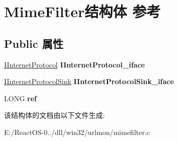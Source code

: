 \hypertarget{struct_mime_filter}{}\section{Mime\+Filter结构体 参考}
\label{struct_mime_filter}
\subsection*{Public 属性}
\begin{DoxyCompactItemize}
\item 
\mbox{\label{struct_mime_filter_a1b7a562b6f889b49c5cbcf7b13ff996d}} 
\hyperlink{interface_i_internet_protocol}{I\+Internet\+Protocol} {\bfseries I\+Internet\+Protocol\+\_\+iface}
\item 
\mbox{\label{struct_mime_filter_a3b451bb0dfb4edc800f9838ce616c352}} 
\hyperlink{interface_i_internet_protocol_sink}{I\+Internet\+Protocol\+Sink} {\bfseries I\+Internet\+Protocol\+Sink\+\_\+iface}
\item 
\mbox{\label{struct_mime_filter_aa3fccdb3311efb9337e2ca278ecf9e70}} 
L\+O\+NG {\bfseries ref}
\end{DoxyCompactItemize}


该结构体的文档由以下文件生成\+:\begin{DoxyCompactItemize}
\item 
E\+:/\+React\+O\+S-\/0../dll/win32/urlmon/mimefilter.\+c\end{DoxyCompactItemize}
